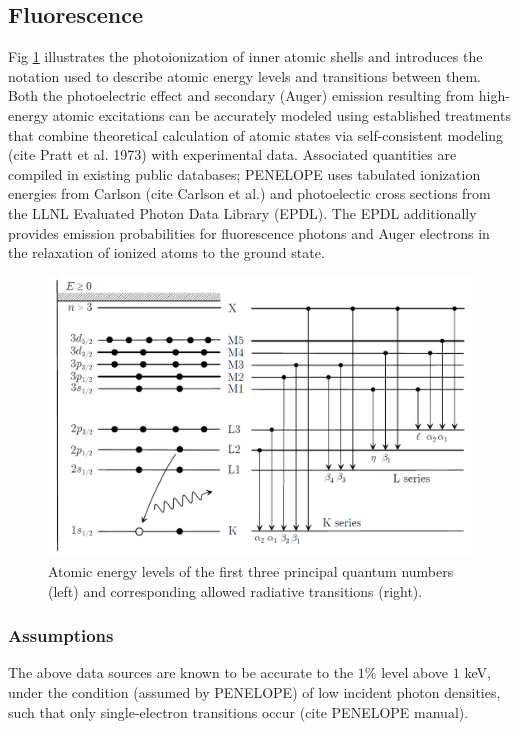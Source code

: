 \documentclass [11pt, proquest, article] {uwthesis}[2016/11/22]
\begin{document}
\subsection{Fluorescence}
Fig \ref{fig:photoionization} illustrates the photoionization of inner atomic shells and introduces the notation used to describe atomic energy levels and transitions between them.
Both the photoelectric effect and secondary (Auger) emission resulting from high-energy atomic excitations can be accurately modeled using established treatments that combine theoretical calculation of atomic states via self-consistent modeling (cite Pratt et al. 1973) with experimental data. Associated quantities are compiled in existing public databases; PENELOPE uses tabulated ionization energies from Carlson (cite Carlson et al.) and photoelectic cross sections from the LLNL Evaluated Photon Data Library (EPDL). The EPDL additionally provides emission probabilities for fluorescence photons and Auger electrons in the relaxation of ionized atoms to the ground state.

\begin{figure}[h] 
\caption{Atomic energy levels of the first three principal quantum numbers (left) and corresponding allowed radiative transitions (right).}
\label{fig:photoionization}
\centering
\includegraphics[scale=0.4]{../Figures/penelope_2_2.png}
\end{figure}



\subsubsection{Assumptions}
The above data sources are known to be accurate to the $1\%$ level above $1$ keV, under the condition (assumed by PENELOPE) of low incident photon densities, such that only single-electron transitions occur (cite PENELOPE manual).
\end{document}
